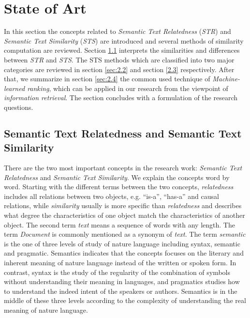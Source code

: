 \section{State of Art}
\label{sec:2}

In this section the concepts related to \textit{Semantic Text Relatedness} (\textit{STR}) and \textit{Semantic Text Similarity} (\textit{STS}) are introduced and several methods of similarity computation are reviewed. Section \ref{sec:2.1} interprets the similarities and differences between \textit{STR} and \textit{STS}. The STS methods which are classified into two major categories are reviewed in section \ref{sec:2.2} and section \ref{2.3} respectively. After that, we summarize in section \ref{sec:2.4} the common used technique of \textit{Machine-learned ranking}, which can be applied in our research from the viewpoint of \textit{information retrieval}. The section concludes with a formulation of the research questions. 


\subsection{Semantic Text Relatedness and Semantic Text Similarity}
\label{sec:2.1}

There are the two most important concepts in the research work: \textit{Semantic Text Relatedness} and \textit{Semantic Text Similarity}. We explain the concepts word by word. Starting with the different terms between the two concepts, \textit{relatedness} includes all relations between two objects, e.g. ``is-a'', ``has-a'' and causal relations, while \textit{similarity} usually is more specific than \textit{relatedness} and describes what degree the characteristics of one object match the characteristics of another object. The second term \textit{text} means a sequence of words with any length. The term \textit{Document} is commonly mentioned as a synonym of \textit{text}. The term \textit{semantic} is the one of three levels of study of nature language including syntax, semantic and pragmatic. Semantics indicates that the concepts focuses on the literary and inherent meaning of nature language instead of the written or spoken form. In contrast, syntax is the study of the regularity of the combination of symbols without understanding their meaning in languages, and pragmatics studies how to understand the indeed intent of the speakers or authors. Semantics is in the middle of these three levels according to the complexity of understanding the real meaning of nature language. 

